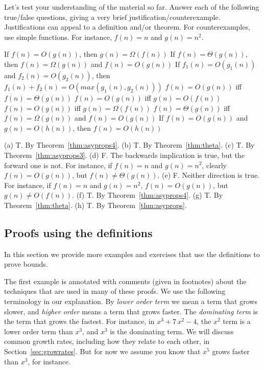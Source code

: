 \begin{exer}
Let's test your understanding of the material so far. Answer each of the following
true/false questions, giving a very brief justification/counterexample.
Justifications can appeal to a definition and/or theorem.
For counterexamples, use simple functions. For instance, $f(n)=n$ and $g(n)=n^2$.
\begin{lenum}
\itemtf
If $f(n)=O(g(n))$,  then $g(n) = \Omega(f(n))$ 
\bigbreak
\itemtf
If $f(n)=\Theta(g(n))$, then $f(n)=\Omega(g(n))$ and $f(n)=O(g(n))$
\bigbreak
\itemtf
If $f_1(n) = O(g_1(n))$ and $f_2(n) = O(g_2(n))$, 
then $f_1(n) + f_2(n) = O(max( g_1(n) , g_2(n)) )$   
\bigbreak
\itemtf
$f(n)=O(g(n))$  iff $f(n)=\Theta(g(n))$
\bigbreak
\itemtf
$f(n)=O(g(n))$  iff $g(n) = O(f(n))$
\bigbreak
\itemtf
$f(n)=O(g(n))$  iff $g(n) = \Omega(f(n))$
\bigbreak
\itemtf
$f(n)=\Theta(g(n))$ iff $f(n)=\Omega(g(n))$ and $f(n)=O(g(n))$
\bigbreak
\itemtf
If $f(n)=O(g(n))$ and $g(n) = O(h(n))$, then $f(n)=O(h(n))$
\end{lenum}
\vspace*{.25in}
\begin{answer}
(a) T. By Theorem~\ref{thm:asyprops4}.
(b) T. By Theorem~\ref{thm:theta}.
(c) T. By Theorem~\ref{thm:asyprops3}.
(d) F. The backwards implication is true, but the forward one is not.  For instance, 
if $f(n)=n$ and $g(n)=n^2$, clearly $f(n)=O(g(n))$, but $f(n)\neq \Theta(g(n))$.
(e) F. Neither direction is true.  For instance, 
if $f(n)=n$ and $g(n)=n^2$, $f(n)=O(g(n))$, but $g(n)\neq O(f(n))$.
(f) T. By Theorem~\ref{thm:asyprops4}.
(g) T. By Theorem~\ref{thm:theta}.
(h) T. By Theorem~\ref{thm:asyprops}.
\end{answer}
\end{exer}



\subsection{Proofs using the definitions}\label{subsec:alProof}

In this section we provide more examples and exercises that use the definitions to 
prove bounds.

The first example is annotated with comments (given in footnotes)
about the techniques that are used in many of these proofs.
We use the following terminology in our explanation.
By {\em lower order term} we mean a term that grows slower, and {\em higher order} means a term that 
grows faster.  The {\em dominating term} is the term that grows the fastest.  For instance, 
in $x^3+7\, x^2-4$, the $x^2$ term is a lower order term than $x^3$, and $x^3$ is the dominating term.
We will discuss common growth rates, including how they relate to each other, 
in Section~\ref{sec:growrates}.
But for now we assume you know that
$x^5$ grows faster than $x^3$, for instance.


